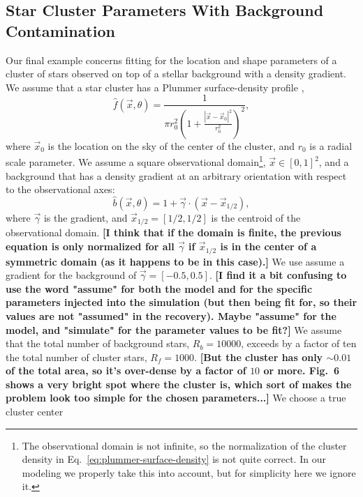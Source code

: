 \documentclass[aps,prd]{revtex4-1}
\newcommand{\ilya}[1]{{\color{red} \bf #1}}
\begin{document}
\subsection{Star Cluster Parameters With Background Contamination}
\label{sec:star-cluster}

Our final example concerns fitting for the location and shape
parameters of a cluster of stars observed on top of a stellar
background with a density gradient.  We assume that a star cluster has
a Plummer surface-density profile \citep{Plummer1911,Aarseth1974},
\begin{equation}
  \label{eq:plummer-surface-density}
  \hat{f}(\vec{x}, \theta) = \frac{1}{\pi r_0^2 \left( 1 + \frac{\left|
          \vec{x} - \vec{x}_0 \right|^2}{r_0^2} \right)^2},
\end{equation}
where $\vec{x}_0$ is the location on the sky of the center of the
cluster, and $r_0$ is a radial scale parameter.  We assume a square
observational domain\footnote{The observational domain is not
  infinite, so the normalization of the cluster density in
  Eq.~\eqref{eq:plummer-surface-density} is not quite correct.  In our
  modeling we properly take this into account, but for simplicity here
  we ignore it.}, $\vec{x} \in [0,1]^2$, and a background that has a
density gradient at an arbitrary orientation with respect to the
observational axes:
\begin{equation}
  \hat{b}\left(\vec{x}, \theta\right) = 1 + \vec{\gamma} \cdot \left( \vec{x}
    - \vec{x}_{1/2} \right),
\end{equation}
where $\vec{\gamma}$ is the gradient, and $\vec{x}_{1/2} = [1/2, 1/2]$
is the centroid of the observational domain.  \ilya{[I think that if
    the domain is finite, the previous equation is only normalized for
    all $\vec{\gamma}$ if $\vec{x}_{1/2}$ is in the center of a
    symmetric domain (as it happens to be in this case).]}  We use
assume a gradient for the background of $\vec{\gamma} = [-0.5, 0.5]$.
\ilya{[I find it a bit confusing to use the word "assume" for both the
    model and for the specific parameters injected into the simulation
    (but then being fit for, so their values are not "assumed" in the
    recovery).  Maybe "assume" for the model, and "simulate" for the
    parameter values to be fit?]}  We assume that the total number of
background stars, $R_b = 10000$, exceeds by a factor of ten the total
number of cluster stars, $R_f = 1000$.  \ilya{[But the cluster has
    only $\sim 0.01$ of the total area, so it's over-dense by a factor
    of $10$ or more.  Fig.~6 shows a very bright spot where the
    cluster is, which sort of makes the problem look too simple for
    the chosen parameters...]}  We choose a true cluster center
\end{document}
